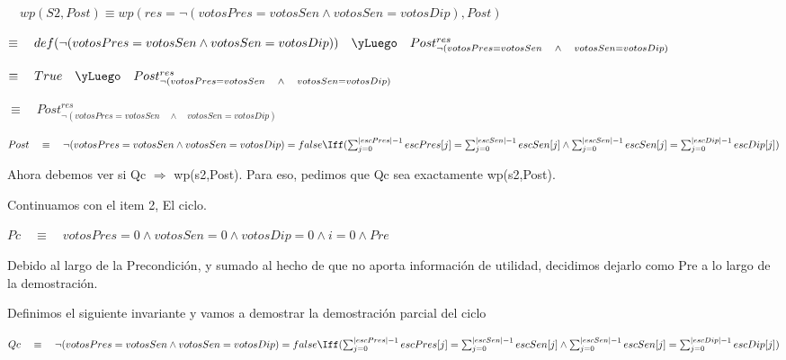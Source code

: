 \documentclass[10pt,a4paper]{article}
\begin{document}
\vspace{0.5cm}
    $\quad wp(S2, Post) \equiv wp(res = \neg(votosPres = votosSen \wedge votosSen = votosDip), Post)$

\vspace{0.3cm}
    $\equiv \quad def(\neg(votosPres = votosSen \wedge votosSen = votosDip)) \quad \yLuego \quad Post^{res}_{\neg(votosPres = votosSen \quad \wedge \quad votosSen = votosDip)}$

\vspace{0.3cm} 
$\equiv \quad True \quad \yLuego \quad Post^{res}_{\neg(votosPres = votosSen \quad \wedge \quad votosSen = votosDip)}$

\vspace{0.3cm} 
$\equiv \quad Post^{res}_{\neg(votosPres = votosSen \quad \wedge \quad votosSen = votosDip)}$

\vspace{0.3cm} 
    $Post \quad \equiv \quad \neg(votosPres = votosSen \wedge votosSen = votosDip) = false \Iff 
	\newline
	( \sum_{j=0}^{|escPres| - 1} escPres[j] = \sum_{j=0}^{|escSen| - 1} escSen[j] \wedge \sum_{j=0}^{|escSen| - 1} escSen[j] = \sum_{j=0}^{|escDip| - 1} escDip[j] )$

\vspace{0.6cm}
    Ahora debemos ver si Qc $\Rightarrow$ wp(s2,Post). Para eso, pedimos que Qc sea exactamente wp(s2,Post).

\pagebreak


\vspace{0.6cm}
    Continuamos con el item 2, El ciclo.
	\vspace{0.3cm}
    
    $Pc \quad \equiv \quad votosPres = 0 \wedge votosSen = 0 \wedge votosDip = 0 \wedge i=0 \wedge Pre$
	
	\vspace{0.3cm}
    Debido al largo de la Precondición, y sumado al hecho de que no aporta información de utilidad, decidimos dejarlo como Pre a lo largo de la demostración.

	\vspace{0.3cm}
	Definimos el siguiente invariante y vamos a demostrar la demostración parcial del ciclo

\vspace{0.3cm}
    $Qc \quad \equiv \quad \neg(votosPres = votosSen \wedge votosSen = votosDip) = false \Iff 
	\newline
	( \sum_{j=0}^{|escPres| - 1} escPres[j] = \sum_{j=0}^{|escSen| - 1} escSen[j] \wedge \sum_{j=0}^{|escSen| - 1} escSen[j] = \sum_{j=0}^{|escDip| - 1} escDip[j] )$
\end{document}
